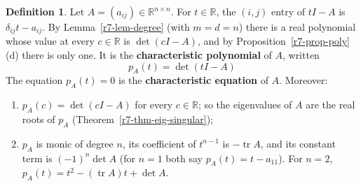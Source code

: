 \documentclass[12pt]{article}
\newcommand{\R}{\mathbb R}
\DeclareMathOperator{\tr}{tr}
\theoremstyle{definition}
\newtheorem{definition}[theorem]{Definition}
\begin{document}
\begin{definition}\label{r7-def-charpoly}
Let \(A=(a_{ij})\in\R^{n\times n}\). For \(t\in\R\), the \((i,j)\) entry of \(tI-A\) is \(\delta_{ij}t-a_{ij}\). By
Lemma~\ref{r7-lem-degree} (with \(m=d=n\)) there is a real polynomial whose value at every \(c\in\R\) is
\(\det(cI-A)\), and by Proposition~\ref{r7-prop-poly}(d) there is only one. It is the \textbf{characteristic
polynomial} of \(A\), written
\[
p_A(t)=\det(tI-A)
\]
The equation \(p_A(t)=0\) is the \textbf{characteristic equation} of \(A\). Moreover:
\begin{enumerate}
\item \(p_A(c)=\det(cI-A)\) for every \(c\in\R\); so the eigenvalues of \(A\) are the real roots of \(p_A\)
(Theorem~\ref{r7-thm-eig-singular});
\item \(p_A\) is monic of degree \(n\), its coefficient of \(t^{n-1}\) is \(-\tr A\), and its constant term is
\((-1)^n\det A\) (for \(n=1\) both say \(p_A(t)=t-a_{11}\)). For \(n=2\), \(p_A(t)=t^2-(\tr A)t+\det A\).
\end{enumerate}
\end{definition}
\end{document}
